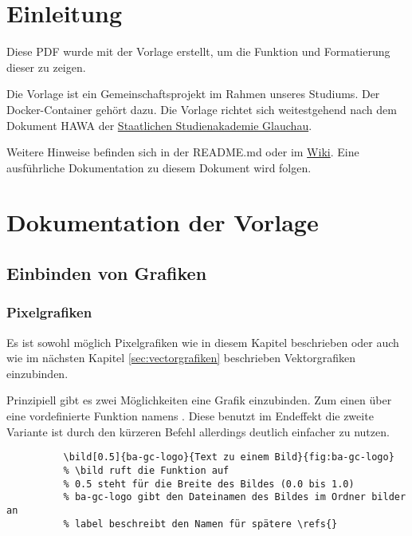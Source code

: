 
\section{Einleitung}
  Diese PDF wurde mit der Vorlage erstellt, um die Funktion und Formatierung dieser zu zeigen.

  Die Vorlage ist ein Gemeinschaftsprojekt im Rahmen unseres Studiums.
  Der Docker-Container gehört dazu.
  Die Vorlage richtet sich weitestgehend nach dem Dokument \ac{HAWA} der \href{https://www.ba-glauchau.de/}{Staatlichen Studienakademie Glauchau}.

  Weitere Hinweise befinden sich in der README.md oder im \href{https://github.com/DSczyrba/Vorlage-Latex/wiki}{Wiki}.
  Eine ausführliche Dokumentation zu diesem Dokument wird folgen.

\section{Dokumentation der Vorlage}
  \subsection{Einbinden von Grafiken}
    \subsubsection{Pixelgrafiken}
      Es ist sowohl möglich Pixelgrafiken wie in diesem Kapitel beschrieben 
      oder auch wie im nächsten Kapitel \ref{sec:vectorgrafiken} beschrieben Vektorgrafiken einzubinden.

      Prinzipiell gibt es zwei Möglichkeiten eine Grafik einzubinden.
      Zum einen über eine vordefinierte Funktion namens \texttt{\bild{}}. 
      Diese benutzt im Endeffekt die zweite Variante ist durch den kürzeren Befehl allerdings deutlich einfacher zu nutzen.
            
      \begin{code}[H]
        \begin{verbatim}
          \bild[0.5]{ba-gc-logo}{Text zu einem Bild}{fig:ba-gc-logo}
          % \bild ruft die Funktion auf
          % 0.5 steht für die Breite des Bildes (0.0 bis 1.0)
          % ba-gc-logo gibt den Dateinamen des Bildes im Ordner bilder an
          % label beschreibt den Namen für spätere \refs{}
        \end{verbatim}
        \caption{Grafiken mittels Bild-Funktion einbinden}
        \label{code:bild-einfuegen1}
        \end{code}

